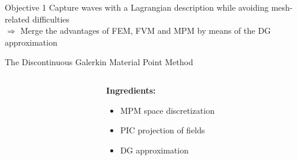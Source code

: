 \begin{withoutheadline}
  \begin{frame}{\text{  }}
    \begin{block}{Objective 1}
      Capture waves with a Lagrangian description while avoiding mesh-related difficulties \\
      \alert{$\Rightarrow$ Merge the advantages of FEM, FVM and MPM by means of the DG approximation}
    \end{block}
    \begin{block}{The Discontinuous Galerkin Material Point Method}
      \begin{columns}
        \begin{column}{0.6\textwidth}
        \end{column}
        \begin{column}{0.4\textwidth}
          \textbf{Ingredients:}
          \begin{itemize}
          \item MPM space discretization
          \item PIC projection of fields
          \item DG approximation
          \end{itemize}
        \end{column}
      \end{columns}
    \end{block}
  \end{frame}
\end{withoutheadline}

